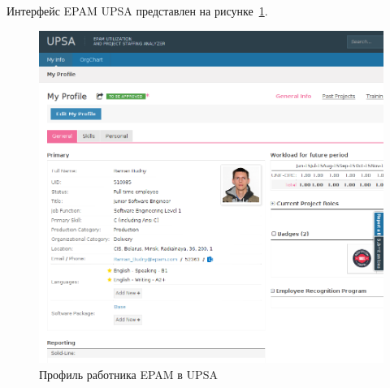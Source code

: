 Интерфейс EPAM UPSA представлен на рисунке~\ref{pic:epam_upsa}.

\begin{figure}[h!]
  \centering
  \includegraphics[width=150mm]{pic/epam_upsa.png}
  \caption{Профиль работника EPAM в UPSA}
  \label{pic:epam_upsa}
\end{figure}
